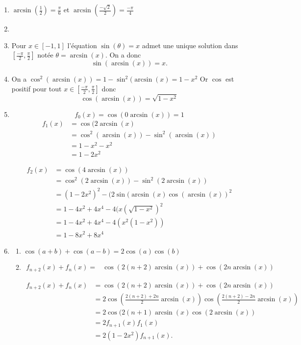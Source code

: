 \begin{correction}
\begin{enumerate}
\item $\arcsin(\frac{1}{2})= \frac{\pi}{6}$ et $\arcsin(\frac{-\sqrt{2}}{2})= \frac{-\pi}{4}$

\item 

\item Pour $x\in [-1, 1]$ l'équation $\sin(\theta)=x$ admet une unique solution dans $[\frac{-\pi}{2}, \frac{\pi}{2}]$ notée 
$\theta=\arcsin(x)$. On a donc 
$$\sin(\arcsin(x)) = x.$$

\item On a $\cos^2(\arcsin(x)) =1-\sin^2(\arcsin(x)=1-x^2$
Or $\cos$ est positif pour tout $x\in [\frac{-\pi}{2}, \frac{\pi}{2}]$ donc 
$$\cos(\arcsin(x)) =\sqrt{1-x^2}$$

\item $$f_0(x) = \cos(0 \arcsin(x)) = 1$$
\begin{align*}
f_1(x) &= \cos(2 \arcsin(x)\\
		&= \cos^2(\arcsin(x)) -\sin^2(\arcsin(x))\\
		&=1-x^2-x^2\\
		&=1-2x^2
\end{align*}


\begin{align*}
f_2(x) &= \cos(4 \arcsin(x))\\
		&= \cos^2(2\arcsin(x)) -\sin^2(2\arcsin(x))\\
		&=(1-2x^2)^2-(2\sin(\arcsin(x)\cos(\arcsin(x))^2\\
		&=1-4x^2+4x^4 - 4(x(\sqrt{1-x^2})^2\\
		&=1-4x^2+4x^4 - 4(x^2(1-x^2))\\
		&=1-8x^2+8x^4
\end{align*}

\item
\begin{enumerate}
\item $\cos(a+b)+\cos(a-b)= 2\cos(a)\cos(b)$
\item 
\begin{align*}
f_{n+2} (x) + f_n(x) =&  \cos(2(n+2) \arcsin(x))  + \cos(2n \arcsin(x)) 
\end{align*}

\begin{align*}
f_{n+2} (x)  +f_n(x)&= \cos(2(n+2) \arcsin(x))  +  \cos(2n \arcsin(x))\\
							&=2 \cos\left(\frac{2(n+2)+2n}{2} \arcsin(x)\right) \cos\left(\frac{2(n+2)-2n}{2} \arcsin(x)\right)\\
							&=2\cos(2(n+1) \arcsin(x) \cos(2\arcsin(x))\\
							&=2 f_{n+1}(x) f_1(x)\\
							&=2(1-2x^2) f_{n+1}(x).
\end{align*}

\end{enumerate}
\end{enumerate}
\end{correction}







